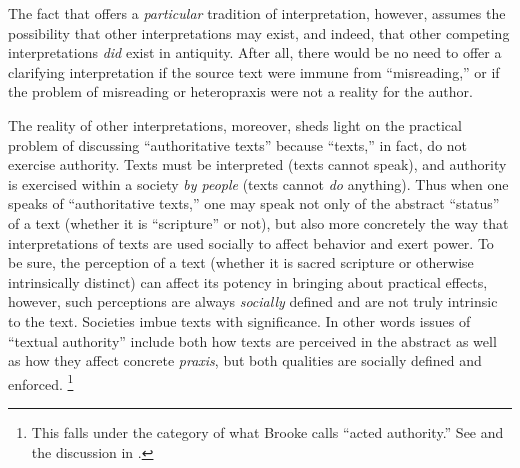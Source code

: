 
The fact that \jub offers a \emph{particular} tradition of interpretation, however, assumes the possibility that other interpretations may exist, and indeed, that other competing interpretations \emph{did} exist in antiquity. After all, there would be no need to offer a clarifying interpretation if the source text were immune from ``misreading,'' or if the problem of misreading or heteropraxis were not a reality for the author. 

The reality of other interpretations, moreover, sheds light on the practical problem of discussing ``authoritative texts'' because ``texts,'' in fact, do not exercise authority. Texts must be interpreted (texts cannot speak), and authority is exercised within a society \emph{by people} (texts cannot \emph{do} anything). Thus when one speaks of ``authoritative texts,'' one may speak not only of the abstract ``status'' of a text (whether it is ``scripture'' or not), but also more concretely the way that interpretations of texts are used socially to affect behavior and exert power.\autocite{foucault_ci1982} To be sure, the perception of a text (whether it is sacred scripture or otherwise intrinsically distinct) can affect its potency in bringing about practical effects, however, such perceptions are always \emph{socially} defined and are not truly intrinsic to the text. Societies imbue texts with significance. In other words issues of ``textual authority'' include both how texts are perceived in the abstract as well as how they affect concrete \emph{praxis}, but both qualities are socially defined and enforced.%
    \footnote{This falls under the category of what Brooke calls ``acted authority.'' See
        \cite[519--523]{brooke_rev-qumran2012} and the discussion in 
        \cite[475]{debel_jsj2014}.}

